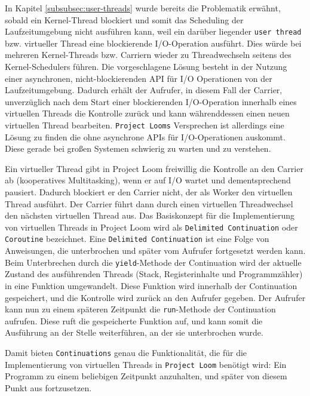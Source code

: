 In Kapitel \ref{subsubsec:user-threads} wurde bereits die Problematik erwähnt, sobald ein Kernel-Thread blockiert und somit
das Scheduling der Laufzeitumgebung nicht ausführen kann, weil ein darüber liegender \verb|user thread| bzw. virtueller Thread
eine blockierende I/O-Operation ausführt.
Dies würde bei mehreren Kernel-Threads bzw. Carriern wieder zu Threadwechseln seitens des Kernel-Schedulers führen.
Die vorgeschlagene Lösung besteht in der Nutzung einer asynchronen, nicht-blockierenden API für I/O Operationen von der Laufzeitumgebung.
Dadurch erhält der Aufrufer, in diesem Fall der Carrier, unverzüglich nach dem Start einer blockierenden I/O-Operation
innerhalb eines virtuellen Threads die Kontrolle zurück und kann währenddessen einen neuen virtuellen Thread bearbeiten.\newline
\verb|Project Looms| Versprechen ist allerdings eine Lösung zu finden die ohne asynchrone APIs für I/O-Operationen auskommt.
Diese gerade bei großen Systemen schwierig zu warten und zu verstehen.\newline

Ein virtueller Thread gibt in Project Loom freiwillig die Kontrolle an den Carrier ab (kooperatives Multitasking), wenn er auf I/O wartet und
dementsprechend pausiert. Dadurch blockiert er den Carrier nicht, der als Worker den virtuellen Thread ausführt.
Der Carrier führt dann durch einen virtuellen Threadwechsel den nächsten virtuellen Thread aus.
Das Basiskonzept für die Implementierung von virtuellen Threads in Project Loom wird als \verb|Delimited Continuation| oder \verb|Coroutine| bezeichnet.\newline
Eine \verb|Delimited Continuation| ist eine Folge von Anweisungen, die unterbrochen und später vom Aufrufer fortgesetzt werden kann.
Beim Unterbrechen durch die \verb|yield|-Methode der Continuation wird der aktuelle Zustand des ausführenden Threads
(Stack, Registerinhalte und Programmzähler) in eine Funktion umgewandelt.
Diese Funktion wird innerhalb der Continuation gespeichert, und die Kontrolle wird zurück an den Aufrufer gegeben.
Der Aufrufer kann nun zu einem späteren Zeitpunkt die \verb|run|-Methode der Continuation aufrufen.
Diese ruft die gespeicherte Funktion auf, und kann somit die Ausführung an der Stelle weiterführen, an der sie unterbrochen wurde.

Damit bieten \verb|Continuations| genau die Funktionalität, die für die Implementierung von virtuellen Threads in \verb|Project Loom| benötigt wird:
Ein Programm zu einem beliebigen Zeitpunkt anzuhalten, und später von diesem Punkt aus fortzusetzen.

